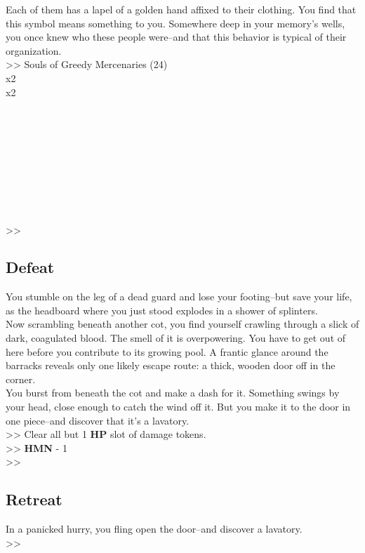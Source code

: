 Each of them has a lapel of a golden hand affixed to their clothing. You find that this symbol means something to you. Somewhere deep in your memory’s wells, you once knew who these people were--and that this behavior is typical of their organization.\\

>> Souls of Greedy Mercenaries (24)\\
 x2\\
 x2\\
\\
\\
\\
\\
\\
\\
\\
\\
\\
>> 

\subsection*{Defeat}
You stumble on the leg of a dead guard and lose your footing--but save your life, as the headboard where you just stood explodes in a shower of splinters.\\

Now scrambling beneath another cot, you find yourself crawling through a slick of dark, coagulated blood. The smell of it is overpowering. You have to get out of here before you contribute to its growing pool. A frantic glance around the barracks reveals only one likely escape route: a thick, wooden door off in the corner.\\

You burst from beneath the cot and make a dash for it. Something swings by your head, close enough to catch the wind off it. But you make it to the door in one piece--and discover that it’s a lavatory.\\

>> Clear all but 1 \textbf{HP} slot of damage tokens.\\
>> \textbf{HMN} - 1\\
>> 

\subsection*{Retreat}
In a panicked hurry, you fling open the door--and discover a lavatory.\\

>> 